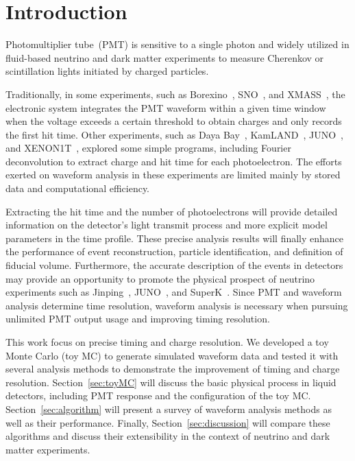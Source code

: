 \section{Introduction}
\label{sec:introduction}

Photomultiplier tube~(PMT) is sensitive to a single photon and widely utilized in fluid-based neutrino and dark matter experiments to measure Cherenkov or scintillation lights initiated by charged particles.

Traditionally, in some experiments, such as Borexino~\cite{lagomarsino_gateless_1999}, SNO~\cite{dunger_event_2019}, and XMASS~\cite{abe_xmass_2013}, the electronic system integrates the PMT waveform within a given time window when the voltage exceeds a certain threshold to obtain charges and only records the first hit time. Other experiments, such as Daya Bay~\cite{huang_flash_2018}, KamLAND~\cite{the_kamland_collaboration_production_2010}, JUNO~\cite{zhang_comparison_2019}, and XENON1T~\cite{aprile_xenon1t_2019}, explored some simple programs, including Fourier deconvolution to extract charge and hit time for each photoelectron. The efforts exerted on waveform analysis in these experiments are limited mainly by stored data and computational efficiency. 

Extracting the hit time and the number of photoelectrons will provide detailed information on the detector's light transmit process and more explicit model parameters in the time profile. These precise analysis results will finally enhance the performance of event reconstruction, particle identification, and definition of fiducial volume. Furthermore, the accurate description of the events in detectors may provide an opportunity to promote the physical prospect of neutrino experiments such as Jinping~\cite{beacom_physics_2017}, JUNO~\cite{an_neutrino_2016}, and SuperK~\cite{noauthor_super-kamiokande_2003}. Since PMT and waveform analysis determine time resolution, waveform analysis is necessary when pursuing unlimited PMT output usage and improving timing resolution. 

This work focus on precise timing and charge resolution. We developed a toy Monte Carlo (toy MC) to generate simulated waveform data and tested it with several analysis methods to demonstrate the improvement of timing and charge resolution. Section~\ref{sec:toyMC} will discuss the basic physical process in liquid detectors, including PMT response and the configuration of the toy MC. Section~\ref{sec:algorithm} will present a survey of waveform analysis methods as well as their performance. Finally, Section~\ref{sec:discussion} will compare these algorithms and discuss their extensibility in the context of neutrino and dark matter experiments. 
